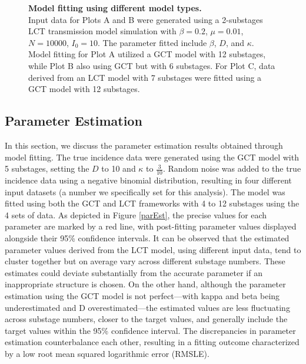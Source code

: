 \documentclass[12pt]{article}
\begin{document}
\begin{figure}[h]
    \centering
    \caption{\textbf{Model fitting using different model types.} \\  Input data for Plots A and B were generated using a 2-substages LCT transmission model simulation with $\beta=0.2$, $\mu=0.01$, $N=10000$, $I_0=10$. The parameter fitted include $\beta$, $D$, and $\kappa$. Model fitting for Plot A utilized a GCT model with 12 substages, while Plot B also using GCT but with 6 substages. For Plot C, data derived from an LCT model with 7 substages were fitted using a GCT model with 12 substages.}
    \label{difftypeFitting}
\end{figure}

\subsection{Parameter Estimation}
\label{parm est}
In this section, we discuss the parameter estimation results obtained through model fitting. The true incidence data were generated using the GCT model with 5 substages, setting the $D$ to 10 and $\kappa$ to $\frac{3}{10}$. Random noise was added to the true incidence data using a negative binomial distribution, resulting in four different input datasets (a number we specifically set for this analysis). The model was fitted using both the GCT and LCT frameworks with 4 to 12 substages using the 4 sets of data. As depicted in Figure \ref{parEst}, the precise values for each parameter are marked by a red line, with post-fitting parameter values displayed alongside their 95\% confidence intervals. It can be observed that the estimated parameter values derived from the LCT model, using different input data, tend to cluster together but on average vary across different substage numbers. These estimates could deviate substantially from the accurate parameter if an inappropriate structure is chosen. On the other hand, although the parameter estimation using the GCT model is not perfect—with kappa and beta being underestimated and D overestimated—the estimated values are less fluctuating across substage numbers, closer to the target values, and generally include the target values within the 95\% confidence interval. The discrepancies in parameter estimation counterbalance each other, resulting in a fitting outcome characterized by a low root mean squared logarithmic error (RMSLE).
\end{document}

